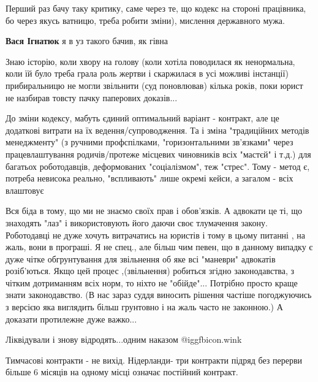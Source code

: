 \begin{itemize}

Перший раз бачу таку критику, саме через те, що кодекс на
стороні працівника, бо через якусь ватницю, треба робити зміни), мислення
державного мужа.

\begin{itemize} %
\textbf{Вася Ігнатюк} я в уз такого бачив, як гівна
\end{itemize} %


Знаю історію, коли хвору на голову (коли хотіла поводилася як ненормальна, коли
їй було треба грала роль жертви і скаржилася в усі можливі інстанції)
прибиральницю не могли звільнити (суд поновлював) кілька років, поки юрист не
назбирав товсту пачку паперових доказів...



До зміни кодексу, мабуть єдиний оптимальний варіант - контракт, але це
додаткові витрати на їх ведення/супроводження. Та і зміна "традиційних методів
менеджменту" (з ручними профспілками, "горизонтальними зв'язками" через
працевлаштування родичів/протеже місцевих чиновників всіх "мастєй" і т.д.) для
багатьох роботодавців, деформованих "соціалізмом", теж "стрес". Тому - метод є,
потреба невисока реально, "вспливають" лише окремі кейси, а загалом - всіх
влаштовує



Вся біда в тому, що ми не знаємо своїх прав і обов'язків. А адвокати це ті, що
знаходять "лаз" і використовують його даючи своє тлумачення закону. Роботодавці
не дуже хочуть витрачатись на юристів і тому в цьому питанні , на жаль, вони в
програші. Я не спец., але більш чим певен, що в данному випадку є дуже чітке
обгрунтування для звільнення об яке всі "маневри" адвокатів розіб'ються. Якщо
цей процес ,(звільнення) робиться згідно законодавства, з чітким дотриманням
всіх норм, то ніхто не "обійде"... Потрібно просто краще знати законодавство.
(В нас зараз суддя виносить рішення частіше погоджуючись з версією яка
виглядить більш грунтовно і на жаль часто не законною.) А доказати протилежне
дуже важко...

Ліквідували і знову відродять...одним наказом @igg{fbicon.wink} 

Тимчасові контракти - не вихід. Нідерланди- три контракти підряд без перерви
більше 6 місяців на одному місці означає постійний контракт.



\end{itemize}
